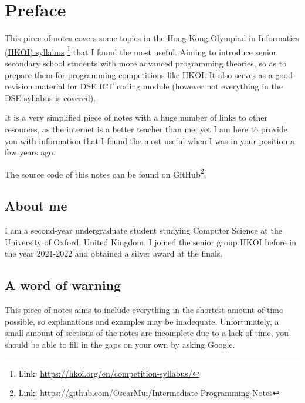 \chapter*{Preface}

This piece of notes covers some topics in the \href{https://hkoi.org/en/competition-syllabus/}{Hong Kong Olympiad in Informatics (HKOI) syllabus} \footnote{Link: \href{https://hkoi.org/en/competition-syllabus/}{https://hkoi.org/en/competition-syllabus/}} that I found the most useful. Aiming to introduce senior secondary school students with more advanced programming theories, so as to prepare them for programming competitions like HKOI. It also serves as a good revision material for DSE ICT coding module (however not everything in the DSE syllabus is covered).

It is a very simplified piece of notes with a huge number of links to other resources, as the internet is a better teacher than me, yet I am here to provide you with information that I found the most useful when I was in your position a few years ago.

The source code of this notes can be found on \href{https://github.com/OscarMui/Intermediate-Programming-Notes}{GitHub}\footnote{Link: \href{https://github.com/OscarMui/Intermediate-Programming-Notes}{https://github.com/OscarMui/Intermediate-Programming-Notes}}.

\section*{About me}

I am a second-year undergraduate student studying Computer Science at the University of Oxford, United Kingdom. I joined the senior group HKOI before in the year 2021-2022 and obtained a silver award at the finals. 

\section*{A word of warning}

This piece of notes aims to include everything in the shortest amount of time possible, so explanations and examples may be inadequate. Unfortunately, a small amount of sections of the notes are incomplete due to a lack of time, you should be able to fill in the gaps on your own by asking Google.

